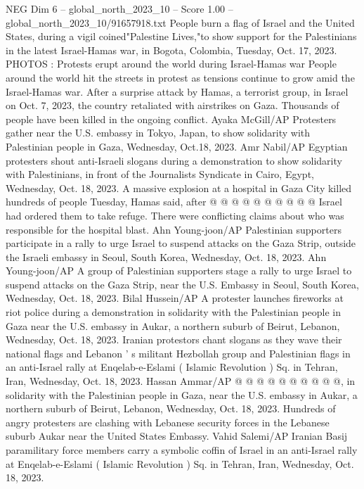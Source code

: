 \begin{textsample}{NEG Dim 6 – global\_north\_2023\_10 – Score 1.00 – global\_north\_2023\_10/91657918.txt}  \label{ex:f6_neg_204}
People burn a flag of Israel and the United States, during a vigil coined"Palestine Lives,"to show support for the Palestinians in the latest Israel-Hamas war, in Bogota, Colombia, Tuesday, Oct. 17, 2023.
PHOTOS : Protests erupt around the world during Israel-Hamas war People around the world hit the streets in protest as tensions continue to grow amid the Israel-Hamas war.
After a surprise attack by Hamas, a terrorist group, in Israel on Oct. 7, 2023, the country retaliated with airstrikes on Gaza.
Thousands of people have been killed in the ongoing conflict.
Ayaka McGill/AP Protesters gather near the U.S. embassy in Tokyo, Japan, to show solidarity with Palestinian people in Gaza, Wednesday, Oct.18, 2023.
Amr Nabil/AP Egyptian protesters shout anti-Israeli slogans during a demonstration to show solidarity with Palestinians, in front of the Journalists Syndicate in Cairo, Egypt, Wednesday, Oct. 18, 2023.
A massive explosion at a hospital in Gaza City killed hundreds of people Tuesday, Hamas said, after @ @ @ @ @ @ @ @ @ @ Israel had ordered them to take refuge.
There were conflicting claims about who was responsible for the hospital blast.
Ahn Young-joon/AP Palestinian supporters participate in a rally to urge Israel to suspend attacks on the Gaza Strip, outside the Israeli embassy in Seoul, South Korea, Wednesday, Oct. 18, 2023.
Ahn Young-joon/AP A group of Palestinian supporters stage a rally to urge Israel to suspend attacks on the Gaza Strip, near the U.S.
Embassy in Seoul, South Korea, Wednesday, Oct. 18, 2023.
Bilal Hussein/AP A protester launches fireworks at riot police during a demonstration in solidarity with the Palestinian people in Gaza near the U.S. embassy in Aukar, a northern suburb of Beirut, Lebanon, Wednesday, Oct. 18, 2023.
Iranian protestors chant slogans as they wave their national flags and Lebanon ' s militant Hezbollah group and Palestinian flags in an anti-Israel rally at Enqelab-e-Eslami ( Islamic Revolution ) Sq. in Tehran, Iran, Wednesday, Oct. 18, 2023.
Hassan Ammar/AP @ @ @ @ @ @ @ @ @ @, in solidarity with the Palestinian people in Gaza, near the U.S. embassy in Aukar, a northern suburb of Beirut, Lebanon, Wednesday, Oct. 18, 2023.
Hundreds of angry protesters are clashing with Lebanese security forces in the Lebanese suburb Aukar near the United States Embassy.
Vahid Salemi/AP Iranian Basij paramilitary force members carry a symbolic coffin of Israel in an anti-Israel rally at Enqelab-e-Eslami ( Islamic Revolution ) Sq. in Tehran, Iran, Wednesday, Oct. 18, 2023.

\end{textsample}
